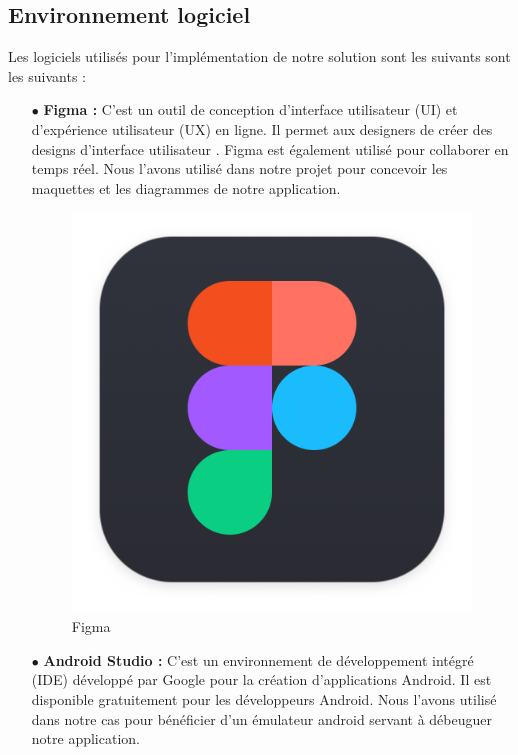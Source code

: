 \newpage
\subsection{ Environnement logiciel }

\noindent Les logiciels utilisés pour l’implémentation de notre solution sont les suivants sont les suivants :

\begin{itemize}
    \item[$\bullet$] \textbf{ Figma  :}
          C'est un outil de conception d’interface utilisateur (UI) et d’expérience utilisateur (UX) en ligne. Il permet aux designers de créer des designs d’interface utilisateur . Figma est également utilisé pour collaborer en temps réel. Nous l’avons utilisé dans notre projet pour concevoir les maquettes et les diagrammes de notre application.

          \begin{figure}[ht]
              \centering \includegraphics[scale=0.07]{chap1.images/FigmaLogo.png}
              \caption{Figma}
              \label{Figma}
          \end{figure}
          \bigskip


    \item[$\bullet$] \textbf{ Android Studio :}
          C'est un environnement de développement intégré (IDE) développé par Google pour la création d’applications Android. Il est disponible gratuitement pour les développeurs Android. Nous l’avons utilisé dans notre cas pour bénéficier d’un émulateur android servant à débeuguer notre application.


\end{itemize}
